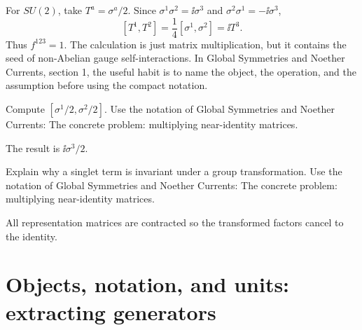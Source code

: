 \begin{example}
For \(SU(2)\), take \(T^a=\sigma^a/2\).  Since \(\sigma^1\sigma^2=\ii\sigma^3\) and \(\sigma^2\sigma^1=-\ii\sigma^3\),
\[
  [T^1,T^2]=\frac14[\sigma^1,\sigma^2]=\ii T^3.
\]
Thus \(f^{123}=1\).  The calculation is just matrix multiplication, but it contains the seed of non-Abelian gauge self-interactions.  In Global Symmetries and Noether Currents, section 1, the useful habit is to name the object, the operation, and the assumption before using the compact notation.
\end{example}



\begin{exercise}
Compute \([\sigma^1/2,\sigma^2/2]\).  Use the notation of Global Symmetries and Noether Currents: The concrete problem: multiplying near-identity matrices.
\begin{answer}
The result is \(\ii\sigma^3/2\).
\end{answer}
\end{exercise}

\begin{exercise}
Explain why a singlet term is invariant under a group transformation.  Use the notation of Global Symmetries and Noether Currents: The concrete problem: multiplying near-identity matrices.
\begin{answer}
All representation matrices are contracted so the transformed factors cancel to the identity.
\end{answer}
\end{exercise}



\section{Objects, notation, and units: extracting generators}














